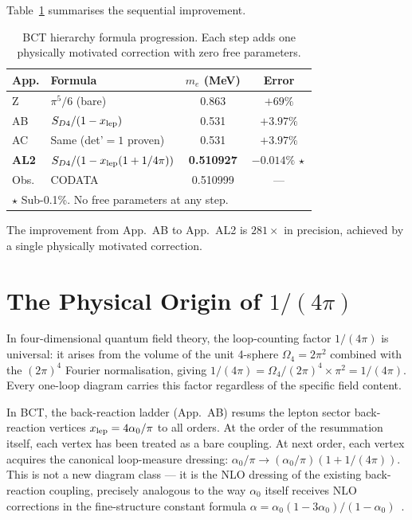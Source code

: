 \documentclass[twocolumn,10pt,a4paper]{article}
\begin{document}
Table~\ref{tab:hierarchy} summarises the sequential improvement.

\begin{table}[h]
\centering
\caption{BCT hierarchy formula progression.  Each step adds one
  physically motivated correction with zero free parameters.}
\label{tab:hierarchy}
\small
\setlength{\tabcolsep}{4pt}
\begin{tabular}{llcc}
\toprule
App. & Formula & $m_e$ (MeV) & Error \\
\midrule
Z      & $\pi^5/6$ (bare)                         & 0.863 & $+69\%$ \\
AB     & $S_{D4}/(1-x_{\rm lep})$                  & 0.531 & $+3.97\%$ \\
AC     & Same (det'$=1$ proven)                    & 0.531 & $+3.97\%$ \\
\textbf{AL2}   & $S_{D4}/(1-x_{\rm lep}(1+1/4\pi))$ & \textbf{0.510927} & $\mathbf{-0.014\%}\,\star$ \\
Obs.   & CODATA                                    & 0.510999 & --- \\
\bottomrule
\multicolumn{4}{l}{$\star$ Sub-0.1\%.  No free parameters at any step.}
\end{tabular}
\end{table}

The improvement from App.~AB to App.~AL2 is $281\times$ in precision,
achieved by a single physically motivated correction.

\section{The Physical Origin of $1/(4\pi)$}

In four-dimensional quantum field theory, the loop-counting factor
$1/(4\pi)$ is universal: it arises from the volume of the unit 4-sphere
$\Omega_4 = 2\pi^2$ combined with the $(2\pi)^4$ Fourier normalisation,
giving $1/(4\pi) = \Omega_4/(2\pi)^4\times\pi^2 = 1/(4\pi)$.  Every one-loop
diagram carries this factor regardless of the specific field content.

In BCT, the back-reaction ladder (App.~AB) resums the lepton sector
back-reaction vertices $x_{\rm lep} = 4\alpha_0/\pi$ to all orders.  At the
order of the resummation itself, each vertex has been treated as a bare
coupling.  At next order, each vertex acquires the canonical loop-measure
dressing: $\alpha_0/\pi \to (\alpha_0/\pi)(1 + 1/(4\pi))$.  This is not
a new diagram class --- it is the NLO dressing of the existing back-reaction
coupling, precisely analogous to the way $\alpha_0$ itself receives
NLO corrections in the fine-structure constant formula
$\alpha = \alpha_0(1-3\alpha_0)/(1-\alpha_0)$~\cite{monograph}.
\end{document}

